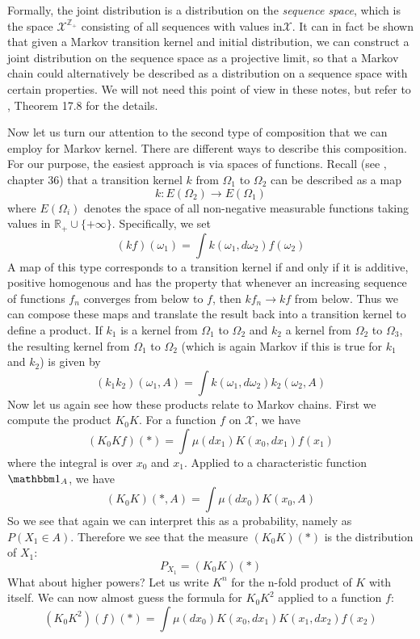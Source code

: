 \documentclass[a4paper, draft]{article}
\theoremstyle{own}
\theoremstyle{remark}
\newcommand{\R}{\mathbb{R}}
\newcommand{\Z}{\mathbb{Z}}
\begin{document}
Formally, the joint distribution is a distribution on the {\em sequence space}, which is the space ${\mathcal X}^{\Z_+}$ consisting of all sequences with values in${\mathcal X}$. It can in fact be shown that given a Markov transition kernel and initial distribution, we can construct a joint distribution on the sequence space as a projective limit, so that a Markov chain could alternatively be described as a distribution on a sequence space with certain properties. We will not need this point of view in these notes, but refer to \cite{Klenke}, Theorem 17.8 for the details.

Now let us turn our attention to the second type of composition that we can employ for Markov kernel. There are different ways to describe this composition. For our purpose, the easiest approach is via spaces of functions. Recall (see \cite{Bauer}, chapter 36) that a transition kernel $k$ from $\Omega_1$ to $\Omega_2$ can be described as a map
$$
k \colon E(\Omega_2) \rightarrow E(\Omega_1)
$$
where $E(\Omega_i)$ denotes the space of all non-negative measurable functions taking values in $\R_+ \cup \{+\infty\}$. Specifically, we set
$$
(kf)(\omega_1) = \int k(\omega_1, d\omega_2)f(\omega_2)
$$
A map of this type corresponds to a transition kernel if and only if it is additive, positive homogenous and has the property that whenever an increasing sequence of functions $f_n$ converges from below to $f$, then $kf_n \rightarrow kf$ from below.  Thus we can compose these maps and translate the result back into a transition kernel to define a product. If $k_1$ is a kernel from $\Omega_1$ to $\Omega_2$ and $k_2$ a kernel from $\Omega_2$ to $\Omega_3$, the resulting kernel from $\Omega_1$ to $\Omega_2$ (which is again Markov if this is true for $k_1$ and $k_2$) is given by
$$
(k_1 k_2)(\omega_1, A) = \int k(\omega_1, d\omega_2) k_2(\omega_2, A)
$$
Now let us again see how these products relate to Markov chains. First we compute the product $K_0 K$. For a function $f$ on ${\mathcal X}$, we have
$$
(K_0 Kf )(*) = \int \mu(dx_1) K(x_0, dx_1) f(x_1)
$$
where the integral is over $x_0$ and $x_1$. Applied to a characteristic function ${\mathbbm 1}_{A}$, we have
$$
(K_0 K)(*,A) = \int \mu(dx_0) K(x_0, A)
$$
So we see that again we can interpret this as a probability, namely as $P(X_1 \in A)$. Therefore we see that  the measure $(K_0 K)(*)$ is the distribution of $X_1$:
$$
P_{X_1} = (K_0 K)(*)
$$
What about higher powers? Let us write $K^n$ for the n-fold product of $K$ with itself. We can now almost guess the formula for $K_0 K^2$ applied to a function $f$:
$$
(K_0 K^2)(f)(*) = \int \mu(dx_0) K(x_0, dx_1) K(x_1, dx_2) f(x_2)
$$
\end{document}
